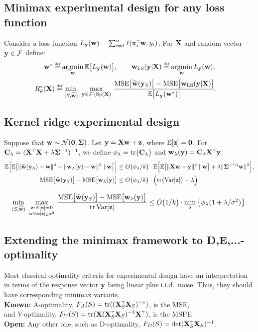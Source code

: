\documentclass[12pt]{../sty/colt2019/colt2018-arxiv}
\begin{document}
\subsection{Minimax experimental design for any loss function}
Consider a loss function $L_\y(\w)=\sum_{i=1}^n\ell(\x_i^\top\w,y_i)$. For $\mathbf X$ and random vector $\mathbf y\in\mathcal{F}$
define:
\begin{align*}
\mathbf w^* \stackrel{\textit{\tiny{def}}}{=} \operatorname*{\mathop{\mathrm{argmin}}}_\mathbf w\mathbb E\big[L_\mathbf y(\mathbf w)\big],\qquad
  \mathbf w_{\mathrm{LS}}(\mathbf y|\mathbf X)\stackrel{\textit{\tiny{def}}}{=} \operatorname*{\mathop{\mathrm{argmin}}}_\mathbf w L_\mathbf y(\mathbf w),
\end{align*}
\begin{align*}
R_k^*(\X)&\defeq
  \min_{(S,\wbh)}\ \max_{\y\in\Fc\backslash\mathrm{Sp}(\X)}\,\frac{\mathrm{MSE}\big[\wbh(\y_S)\big]-
     \mathrm{MSE}\big[\wols(\y|\X)\big]
  }{\E\big[L_\y(\w^*)\big]}.
\end{align*}
\subsection{Kernel ridge experimental design}
\begin{conjecture}
Suppose that $\mathbf w\sim \mathcal{N}(\mathbf 0,\mathbf{\Sigma})$. Let $\mathbf y=\mathbf X\mathbf w+\mathbf z$,
where $\mathbb E[\mathbf z]=\mathbf 0$. For $\C_\lambda=(\X^\top\X+\lambda\Sigmab^{-1})^{-1}$,
we define
$\phi_\lambda=\mathrm{tr}\big(\mathbf C_\lambda\big)$ and 
$\w_\lambda(\y)=\C_\lambda\X^\top\y$. 
\begin{align*}
  \mathbb E\Big[\mathbb E\big[\|\widehat{\mathbf w}(\mathbf y_S) - \mathbf w\|^2
  -\|\mathbf w_\lambda(\mathbf y)-\mathbf w\|^2\mid\mathbf w\big]\Big]
  &\leq
O\big(\phi_\lambda/k\big)\cdot\mathbb E\Big[\mathbb E\big[\|\mathbf X\mathbf w-\mathbf y\|^2\mid \mathbf w\big] +
    \lambda\|\mathbf{\Sigma}^{-\sfrac12}\mathbf w\|^2\Big],
  \\
  {\mathrm{MSE}\big[\widehat{\mathbf w}(\mathbf y_S)\big]} - {\mathrm{MSE}\big[\mathbf w_\lambda(\mathbf y)\big]}
&\leq O\big(\phi_\lambda/k\big) \cdot\Big(\mathrm{tr}\big(\mathrm{Var}[\mathbf z]\big)+ \lambda\Big)
\end{align*}

\begin{align*}
\min_{(S,\widehat{\mathbf w})}\ \max_{\underset{\mathrm{tr}\mathrm{Var}[\mathbf z]\geq \sigma^2}{\mathbf z:\,\mathbb E[\mathbf z]=\mathbf 0}}\,\frac{  {\mathrm{MSE}\big[\widehat{\mathbf w}(\mathbf y_S)\big]} - {\mathrm{MSE}\big[\mathbf w_\lambda(\mathbf y)\big]}
  }{\mathrm{tr}\,\mathrm{Var}[\mathbf z]}\leq O\big(1/k\big)\cdot \min_\lambda\big\{ \phi_\lambda(1+\lambda/\sigma^2)\big\}.
\end{align*}
\end{conjecture}


\subsection{Extending the minimax framework to D,E,...-optimality}
Most classical optimality criteria for experimental design have an interpretation in terms of the response vector $\mathbf y$ being linear plus i.i.d.~noise. Thus, they should have corresponding minimax variants.\\
\textbf{Known:} A-optimality, $F_A(S)=\tr((\X_S^\top\X_S)^{-1})$, is the MSE,\\
and $V$-optimality, $F_V(S)=\tr(\X(\X_S^\top\X_S)^{-1}\X^\top)$,  is the MSPE\\ 
\textbf{Open:} Any other one, such as D-optimality, $F_D(S)=\det(\X_S^\top\X_S)^{-1}$.
\end{document}
